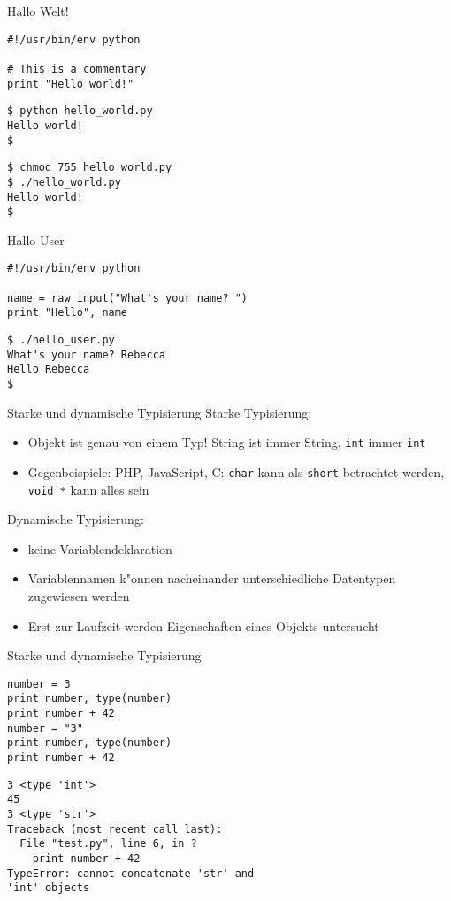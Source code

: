 \begin{frame}[fragile]{Hallo Welt!}
\begin{lstlisting}[style=Python]
#!/usr/bin/env python

# This is a commentary
print "Hello world!"
\end{lstlisting}
\begin{lstlisting}[style=Shell]
$ python hello_world.py
Hello world!
$
\end{lstlisting}%
\begin{lstlisting}[style=Shell]
$ chmod 755 hello_world.py
$ ./hello_world.py
Hello world!
$
\end{lstlisting} %
\end{frame}

\begin{frame}[fragile]{Hallo User}
\begin{lstlisting}[style=Python]
#!/usr/bin/env python

name = raw_input("What's your name? ")
print "Hello", name
\end{lstlisting}
\begin{lstlisting}[style=Shell]
$ ./hello_user.py
What's your name? Rebecca
Hello Rebecca
$
\end{lstlisting}
\end{frame}

\begin{frame}{Starke und dynamische Typisierung}
\alert{Starke Typisierung:}
\begin{itemize}
\item Objekt ist genau von einem Typ! String ist immer String, \texttt{int} immer \texttt{int}
\item Gegenbeispiele: PHP, JavaScript, C: \texttt{char} kann als \texttt{short} betrachtet werden, \texttt{void~*} kann alles sein
\end{itemize}
\alert{Dynamische Typisierung: }
\begin{itemize}
\item keine Variablendeklaration
\item Variablennamen k"onnen nacheinander unterschiedliche Datentypen zugewiesen werden
\item Erst zur Laufzeit werden Eigenschaften eines Objekts untersucht
\end{itemize}
\end{frame}

\begin{frame}[fragile]{Starke und dynamische Typisierung}
\begin{lstlisting}[style=Python]
number = 3
print number, type(number)
print number + 42
number = "3"
print number, type(number)
print number + 42
\end{lstlisting}
\begin{lstlisting}[style=Shell]
3 <type 'int'>
45
3 <type 'str'>
Traceback (most recent call last):
  File "test.py", line 6, in ?
    print number + 42
TypeError: cannot concatenate 'str' and 
'int' objects
\end{lstlisting}
\end{frame}

